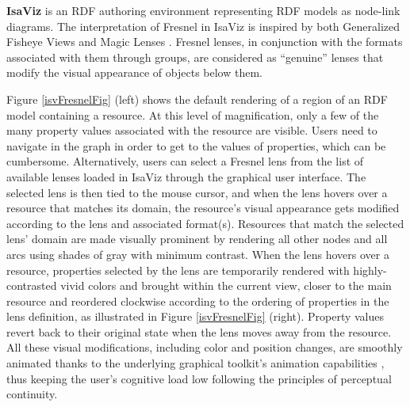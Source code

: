 \vspace{1em}
{\bf IsaViz} is an RDF authoring environment representing RDF models as node-link diagrams. The interpretation of Fresnel in IsaViz is inspired by both Generalized Fisheye Views \cite{furnas06} and Magic Lenses \cite{bier93}. Fresnel lenses, in conjunction with the formats associated with them through groups, are considered as ``genuine'' lenses that modify the visual appearance of objects below them.

Figure \ref{isvFresnelFig} (left) shows the default rendering of a region of an RDF model containing a  resource. At this level of magnification, only a few of the many property values associated with the resource are visible. Users need to navigate in the graph in order to get to the values of properties, which can be cumbersome. Alternatively, users can select a Fresnel lens from the list of available lenses loaded in IsaViz through the graphical user interface. The selected lens is then tied to the mouse cursor, and when the lens hovers over a resource that matches its domain, the resource's visual appearance gets modified according to the lens and associated format(s). Resources that match the selected lens' domain are made visually prominent by rendering all other nodes and all arcs using shades of gray with minimum contrast. When the lens hovers over a resource, properties selected by the lens are temporarily rendered with highly-contrasted vivid colors and brought within the current view,
closer to the main resource and reordered clockwise according to the ordering of properties in the lens definition, as illustrated in Figure \ref{isvFresnelFig} (right). Property values revert back to their original state when the lens moves away from the resource. All these visual modifications, including color and position changes, are smoothly animated thanks to the underlying graphical toolkit's animation capabilities \cite{pietriga05}, thus keeping the user's cognitive load low following the principles of perceptual continuity.

